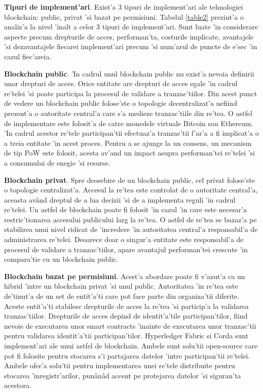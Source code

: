 \documentclass[12pt,a4paper,twoside]{report}
\begin{document}
	
	\textbf{Tipuri de implement'ari}. Exist'a 3 tipuri de implement'ari ale tehnologiei blockchain: public, privat 'si bazat pe permisiuni\cite{permiss}\cite{ppp}. Tabelul \ref{table2} prezint'a o analiz'a la nivel 'inalt a celor 3 tipuri de implement'ari. Sunt luate 'in considerare aspecte precum drepturile de acces, performan'ta, costurile implicate, avantajele 'si dezavantajele fiecarei implement'ari precum 'si num'arul de puncte de e'sec 'in cazul fiec'areia.
		
	\textbf{Blockchain public}. 'In cadrul unul blockchain public nu exist'a nevoia definirii unor  drepturi de acces. Orice entitate are drepturi de acces egale 'in cadrul re'telei 'si poate participa la procesul de validare a tranzac'tiilor. Din acest punct de vedere un blockchain public folose'ste o topologie decentralizat'a nefiind prezent'a o autoritate central'a care s'a medieze tranzac'tiile din re'tea. O astfel de implementare este folosit'a de catre monedele virtuale Bitcoin sau Ethereum. 'In cadrul acestor re'tele participan'tii efectuaz'a tranzac'tii f'ar'a a fi implicat'a o a treia entitate 'in acest proces. Pentru a se ajunge la un consens, un mecanism de tip PoW este folosit, acesta av'and un impact asupra performan'tei re'telei 'si a consumului de enegie 'si resurse\cite{energy-bit}.
	
	\textbf{Blockchain privat}. Spre deosebire de un blockchain public, cel privat folose'ste o topologie centralizat'a. Accesul la re'tea este controlat de o autoritate central'a, aceasta av\^and dreptul de a lua decizii 'si de a implementa reguli 'in cadrul re'telei. Un astfel de blockchain poate fi folosit 'in cazul 'in care este necesar'a restric'tionarea accesului publicului larg la re'tea. O astfel de re'tea se bazaz'a pe stabilirea unui nivel ridicat de 'incredere 'in autoritatea central'a responsabil'a de administrarea re'telei. Deoarece doar o singur'a entitate este responsabil'a de procesul de validare a tranzac'tiilor, apare avantajul performan'tei crescute 'in compara'tie cu un blockchain public.
	
	\textbf{Blockchain bazat pe permisiuni}. Acest'a abordare poate fi v'azut'a ca un hibrid 'intre un blockchain privat 'si unul public. Autoritatea 'in re'tea este de'tinut'a de un set de entit'a'ti care pot face parte din organiza'tii diferite. Aceste entit'a'ti stabilesc drepturile de acces la re'tea 'si particip'a la validarea tranzac'tiilor. Drepturile de acces depind de identit'a'tile participan'tilor, fiind nevoie de executarea unor smart contracts 'inainte de executarea unor tranzac'tii pentru validarea identit'a'tii participan'tilor. Hyperledger Fabric\cite{hlfv} si Corda sunt implement'ari ale unui astfel de blockchain. Ambele sunt solu'tii open-source care pot fi folosite pentru stocarea s'i partajarea datelor 'intre participan'tii re'telei. Ambele ofer'a solu'tii pentru implementarea unei re'tele distribuite pentru stocarea 'inregistr'arilor, pun\^an\^ad accent pe protejarea datelor 'si siguran'ta acestora.
	
\end{document}
